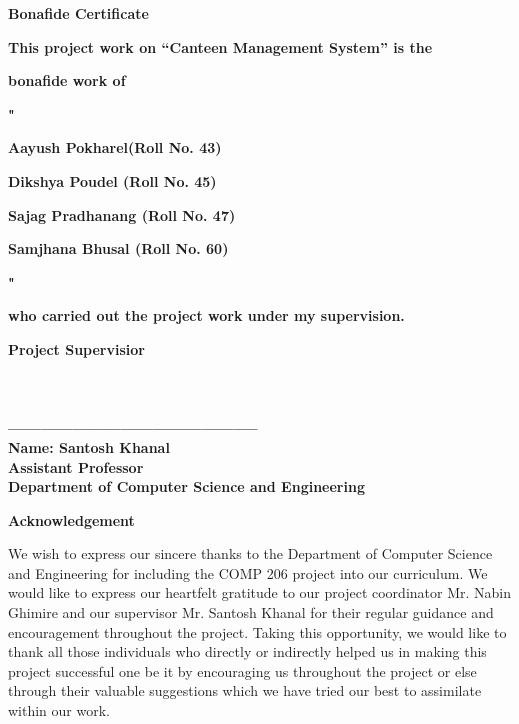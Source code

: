 \documentclass[12pt]{article}
\begin{document}
\clearpage
\thispagestyle{empty}
\vspace*{10mm}
\centerline{\textbf{\LARGE{Bonafide Certificate}}}
\vspace*{30mm}
\centerline{\textbf{\Large{This project work on “Canteen Management System” is the}}} 
\vspace*{2mm}
\centerline{\textbf{\Large{bonafide work of}}}
\vspace*{2mm}
\centerline{\textbf{\Large{"}}}
\centerline{\textbf{\Large{Aayush Pokharel(Roll No. 43)}}}
\centerline{\textbf{\Large{Dikshya Poudel (Roll No. 45)}}}
\centerline{\textbf{\Large{Sajag Pradhanang (Roll No. 47)}}}
\centerline{\textbf{\Large{Samjhana Bhusal (Roll No. 60)}}}
\centerline{\textbf{\Large{"}}}
\vspace*{2mm}
\centerline{\textbf{\Large{who carried out the project work under my supervision.}}}
\vspace*{30mm}
\textbf{\Large{Project Supervisior}}
\\\\
\\\\
\textbf{-----------------------------------------------}
\vspace*{2mm}
\\
{\textbf{\Large{Name: Santosh Khanal}}}
\vspace*{2mm}\\
{\textbf{\Large{Assistant Professor}}}
\vspace*{2mm}\\
{\textbf{\Large{Department of Computer Science and Engineering}}}

\clearpage
\thispagestyle{empty}

\textbf{\Large{Acknowledgement}}
\vspace*{5mm}

We wish to express our sincere thanks to the Department of Computer Science and Engineering for including the COMP 206 project into our curriculum. We would like to express 
our heartfelt gratitude to our project coordinator Mr. Nabin Ghimire and our supervisor Mr. Santosh Khanal for their regular guidance and encouragement throughout the project. 
Taking this opportunity, we would like to thank all those individuals who directly or indirectly helped us in making this project successful one be it by encouraging us 
throughout the project or else through their valuable suggestions which we have tried our best to assimilate within our work.


\clearpage
\thispagestyle{empty}
\end{document}
